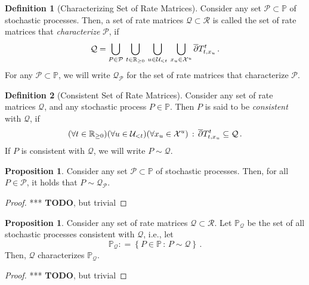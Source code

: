 \documentclass[10pt]{paper}
\theoremstyle{definition}
\newtheorem{proposition}[theorem]{Proposition}
\newtheorem{definition}{Definition}
\newcommand{\reals}{\mathbb{R}}
\newcommand{\realsnonneg}{\reals_{\geq 0}}
\newcommand{\states}{\mathcal{X}}
\newcommand{\processes}{\mathbb{P}}
\newcommand{\rateset}{\mathcal{Q}}
\newcommand{\coloneqq}{:\!=}
\begin{document}
\begin{definition}[Characterizing Set of Rate Matrices]
Consider any set $\mathcal{P}\subset\processes$ of stochastic processes. Then, a set of rate matrices $\rateset\subset\mathcal{R}$ is called the set of rate matrices that \emph{characterize} $\mathcal{P}$, if
\begin{equation*}
\rateset = \bigcup_{P\in\mathcal{P}}\,\bigcup_{t\in\realsnonneg}\,\bigcup_{u\in\mathcal{U}_{<t}}\,\bigcup_{x_u\in\states^u}\smash{\overline{\partial}}T_{t,x_u}^t\,.
\end{equation*}
For any $\mathcal{P}\subset\processes$, we will write $\rateset_{\mathcal{P}}$ for the set of rate matrices that characterize $\mathcal{P}$.
\end{definition}

\begin{definition}[Consistent Set of Rate Matrices]
Consider any set of rate matrices $\rateset$, and any stochastic process $P\in\processes$. Then $P$ is said to be \emph{consistent} with $\rateset$, if
\begin{equation*}
(\forall t\in\realsnonneg)(\forall u\in\mathcal{U}_{<t})(\forall x_u\in\states^u)\,:\, \smash{\overline{\partial}}T_{t,x_u}^t \subseteq \rateset\,.
\end{equation*}
If $P$ is consistent with $\rateset$, we will write $P\sim\rateset$.
\end{definition}

\begin{proposition}
Consider any set $\mathcal{P}\subset\processes$ of stochastic processes. Then, for all $P\in\mathcal{P}$, it holds that $P\sim\rateset_{\mathcal{P}}$.
\end{proposition}
\begin{proof}
*** {\bf TODO}, but trivial
\end{proof}

\begin{proposition}
Consider any set of rate matrices $\rateset\subset\mathcal{R}$. Let $\mathbb{P}_\rateset$ be the set of all stochastic processes consistent with $\rateset$, i.e., let
\begin{equation*}
\mathbb{P}_\rateset \coloneqq \left\{P\in\processes\,:\,P\sim\rateset\right\}\,.
\end{equation*}
Then, $\rateset$ characterizes $\mathbb{P}_\rateset$.
\end{proposition}
\begin{proof}
*** {\bf TODO}, but trivial
\end{proof}
\end{document}
